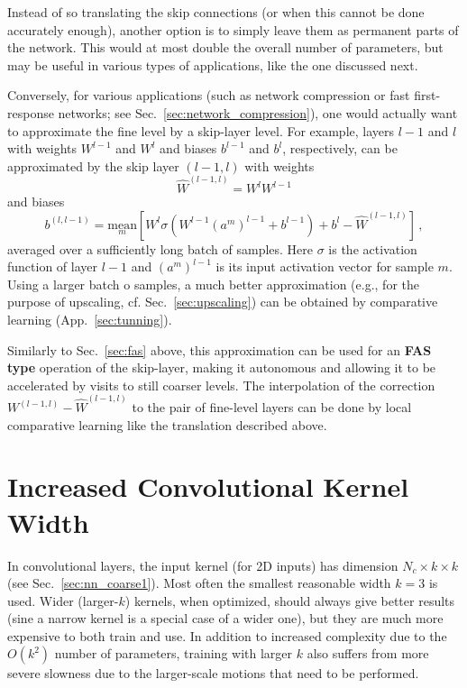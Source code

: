 \documentclass{article} %
\begin{document}
Instead of so translating the skip connections (or when this cannot be done accurately enough), another option is to simply leave them as permanent parts of the network. This would at most double the overall number of parameters, but may be useful in various types of applications, like the one discussed next.

Conversely, for various applications (such as network compression or fast first-response networks; see Sec.~\ref{sec:network_compression}), one would actually want to approximate the fine level by a skip-layer level. For example, layers $l-1$ and $l$ with weights $W^{l-1}$ and $W^l$ and biases $b^{l-1}$ and $b^l$, respectively, can be approximated by the skip layer $(l-1,l)$ with weights
$$ \hat{W}^{(l-1,l)} = W^l W^{l-1} $$
and biases
$$ b^{(l,l-1)} = \underset{m}{\mathrm{mean}} \left[ W^l \sigma(W^{l-1}(a^m)^{l-1} + b^{l-1}) + b^l - \hat{W}^{(l-1,l)} \right]\,,$$
averaged over a sufficiently long batch of samples. Here $\sigma$ is the activation function of layer $l-1$ and $(a^m)^{l-1}$ is its input activation vector for sample $m$. Using a larger batch o samples, a much better approximation (e.g., for the purpose of upscaling, cf. Sec.~\ref{sec:upscaling}) can be obtained by comparative learning (App.~\ref{sec:tunning}).

Similarly to Sec.~\ref{sec:fas} above, this approximation can be used for an \textbf{FAS type} operation of the skip-layer, making it autonomous and allowing it to be accelerated by visits to still coarser levels. The interpolation of the correction $ W^{(l-1,l)}  - \hat{W}^{(l-1,l)}$ to the pair of fine-level layers can be done by local comparative learning like the translation described above.

\section{Increased Convolutional Kernel Width}
\label{sec:extended_region}
In convolutional layers, the input kernel (for 2D inputs) has dimension $N_c \times k \times k$ (see Sec.~\ref{sec:nn_coarse1}). Most often the smallest reasonable width $k = 3$ is used. Wider (larger-$k$) kernels, when optimized, should always give better results (sine a narrow kernel is a special case of a wider one), but they are much more expensive to both train and use. In addition  to increased complexity due to the $O(k^2)$ number of parameters, training with larger $k$ also suffers from more severe slowness due to the larger-scale motions that need to be performed.
\end{document}
